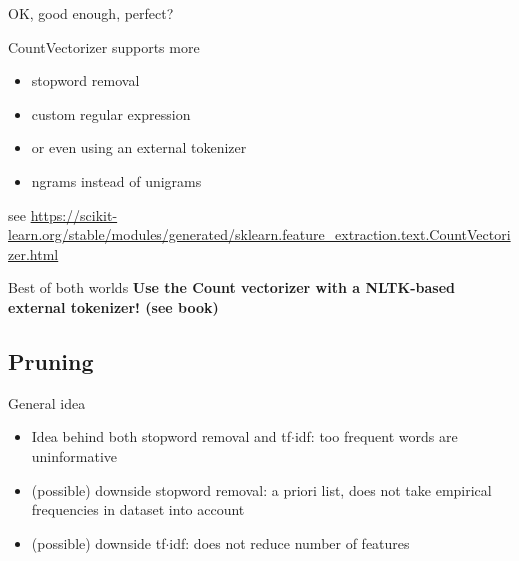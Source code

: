\begin{frame}{OK, good enough, perfect?}
	\begin{block}{CountVectorizer supports more}
		\begin{itemize}
			\item stopword removal
			\item custom regular expression
			\item or even using an external tokenizer
			\item ngrams instead of unigrams
		\end{itemize}
	\end{block}
	\tiny{see \url{https://scikit-learn.org/stable/modules/generated/sklearn.feature\_extraction.text.CountVectorizer.html}}
	
	\pause
	\begin{alertblock}{Best of both worlds}
		\textbf{Use the Count vectorizer with a NLTK-based external tokenizer! (see book)}
	\end{alertblock}
\end{frame}


\subsection{Pruning}

\begin{frame}{General idea}
	\begin{itemize}
		\item Idea behind both stopword removal and tf$\cdot$idf: too frequent words are uninformative
		\item<2-> (possible) downside stopword removal: a priori list, does not take empirical frequencies in dataset into account
		\item<3-> (possible) downside tf$\cdot$idf: does not reduce number of features
	\end{itemize}
	
\end{frame}

